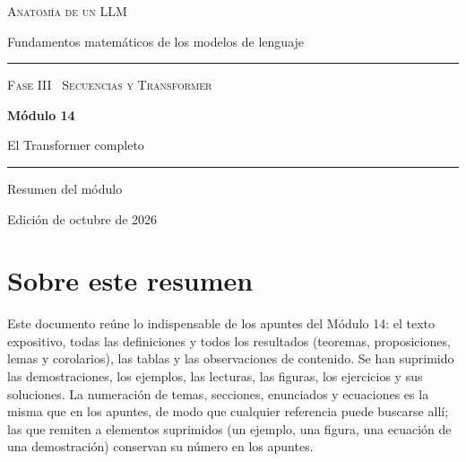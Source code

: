 \documentclass[11pt,a4paper,twoside,openany]{book}
\begin{document}
\frontmatter
\begin{titlepage}
\centering
\vspace*{2.5cm}
{\large\scshape Anatomía de un LLM}\par
\vspace{0.4cm}
{\normalsize Fundamentos matemáticos de los modelos de lenguaje}\par
\vspace{2.2cm}
\rule{\textwidth}{0.8pt}\par\vspace{0.5cm}
{\small\scshape Fase III \textperiodcentered\ Secuencias y Transformer}\par\vspace{0.3cm}
{\Huge\bfseries Módulo 14\par}\vspace{0.3cm}
{\LARGE El Transformer completo\par}
\vspace{0.5cm}\rule{\textwidth}{0.4pt}\par
\vspace{1.6cm}
{\large Resumen del módulo}\par
\vfill
{\small Edición de octubre de 2026}\par
\end{titlepage}

\chapter*{Sobre este resumen}

Este documento reúne lo indispensable de los apuntes del Módulo 14: el texto expositivo, todas las definiciones y todos los resultados (teoremas, proposiciones, lemas y corolarios), las tablas y las observaciones de contenido. Se han suprimido las demostraciones, los ejemplos, las lecturas, las figuras, los ejercicios y sus soluciones. La numeración de temas, secciones, enunciados y ecuaciones es la misma que en los apuntes, de modo que cualquier referencia puede buscarse allí; las que remiten a elementos suprimidos (un ejemplo, una figura, una ecuación de una demostración) conservan su número en los apuntes.
\end{document}
